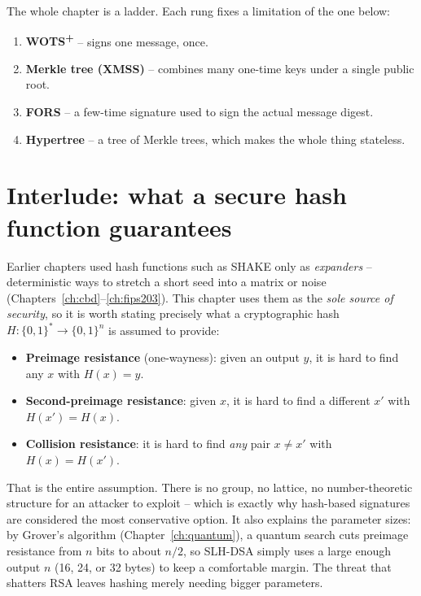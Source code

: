 The whole chapter is a ladder. Each rung fixes a limitation of the one below:

\begin{enumerate}
  \item \textbf{WOTS\textsuperscript{+}} -- signs one message, once.
  \item \textbf{Merkle tree (XMSS)} -- combines many one-time keys under a single public root.
  \item \textbf{FORS} -- a few-time signature used to sign the actual message digest.
  \item \textbf{Hypertree} -- a tree of Merkle trees, which makes the whole thing stateless.
\end{enumerate}

\section{Interlude: what a secure hash function guarantees}

Earlier chapters used hash functions such as SHAKE only as \emph{expanders} -- deterministic ways to stretch a short seed into a matrix or noise (Chapters~\ref{ch:cbd}--\ref{ch:fips203}). This chapter uses them as the \emph{sole source of security}, so it is worth stating precisely what a cryptographic hash $H:\{0,1\}^* \to \{0,1\}^n$ is assumed to provide:

\begin{itemize}
  \item \textbf{Preimage resistance} (one-wayness): given an output $y$, it is hard to find any $x$ with $H(x)=y$.
  \item \textbf{Second-preimage resistance}: given $x$, it is hard to find a different $x'$ with $H(x')=H(x)$.
  \item \textbf{Collision resistance}: it is hard to find \emph{any} pair $x \neq x'$ with $H(x)=H(x')$.
\end{itemize}

That is the entire assumption. There is no group, no lattice, no number-theoretic structure for an attacker to exploit -- which is exactly why hash-based signatures are considered the most conservative option. It also explains the parameter sizes: by Grover's algorithm (Chapter~\ref{ch:quantum}), a quantum search cuts preimage resistance from $n$ bits to about $n/2$, so SLH-DSA simply uses a large enough output $n$ (16, 24, or 32 bytes) to keep a comfortable margin. The threat that shatters RSA leaves hashing merely needing bigger parameters.

